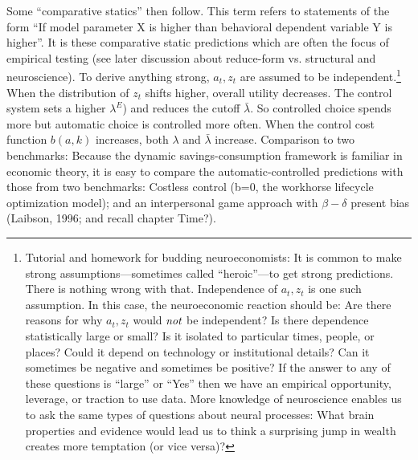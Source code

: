 \documentclass{article}
\begin{document}
Some “comparative statics” then follow. This term refers to statements of the form “If model parameter X is higher than behavioral dependent variable Y is higher”. It is these comparative static predictions which are often the focus of empirical testing (see later discussion about reduce-form vs. structural and neuroscience).
To derive anything strong, $a_t, z_t$ are assumed to be independent.\footnote{Tutorial and homework for budding neuroeconomists: It is common to make strong assumptions—sometimes called ``heroic”—to get strong predictions. There is nothing wrong with that. Independence of $a_t, z_t$ is one such assumption. In this case, the neuroeconomic reaction should be: Are there reasons for why $a_t, z_t$ would $\emph{not}$ be independent? Is there dependence statistically large or small? Is it isolated to particular times, people, or places? Could it depend on technology or institutional details? Can it sometimes be negative and sometimes be positive? If the answer to any of these questions is “large” or “Yes” then we have an empirical opportunity, leverage, or traction to use data. More knowledge of neuroscience enables us to ask the same types of questions about neural processes: What brain properties and evidence would lead us to think a surprising jump in wealth creates more temptation (or vice versa)?} 
When the distribution of $z_t$ shifts higher, overall utility decreases. The control system sets a higher $\lambda^E$) and reduces the cutoff $\bar{\lambda}$. So controlled choice spends more but automatic choice is controlled more often. 
When the control cost function $b(a,k)$ increases, both $\lambda$ and $\bar{\lambda}$ increase.
Comparison to two benchmarks: Because the dynamic savings-consumption framework is familiar in economic theory, it is easy to compare the automatic-controlled predictions with those from two benchmarks: Costless control (b=0, the workhorse lifecycle optimization model); and an interpersonal game approach with $\beta-\delta$ present bias (Laibson, 1996; and recall chapter Time?).
\end{document}
